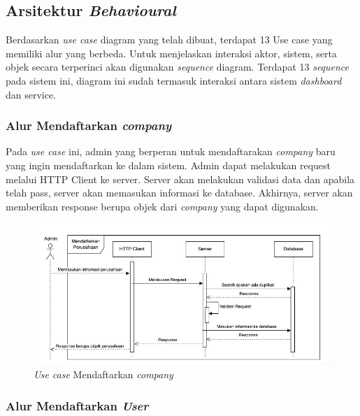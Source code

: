 \subsection{Arsitektur \textit{Behavioural}}
\label{subsec:arsitektur-behavioural}

Berdasarkan \textit{use case} diagram yang telah dibuat, terdapat 13 Use case yang memiliki alur yang berbeda. Untuk menjelaskan interaksi aktor, sistem, serta objek secara terperinci akan digunakan \textit{sequence} diagram. Terdapat 13 \textit{sequence} pada sistem ini, diagram ini sudah termasuk interaksi antara sistem \textit{dashboard} dan service.

\subsubsection{Alur Mendaftarkan \textit{company}}

Pada \textit{use case} ini, admin yang berperan untuk mendaftarakan \textit{company} baru yang ingin mendaftarkan ke dalam sistem. Admin dapat melakukan request melalui HTTP Client ke server. Server akan melakukan validasi data dan apabila telah pass, server akan memasukan informasi ke database. Akhirnya, server akan memberikan response berupa objek dari \textit{company} yang dapat digunakan.

\begin{figure}
  \centering
  \includegraphics[width=1\textwidth]{resources/chapter-3/usecase/uc-01.jpg}
  \caption{\textit{Use case} Mendaftarkan \textit{company}}
  \label{fig:usecase-01}
\end{figure}

\pagebreak

\subsubsection{Alur Mendaftarkan \textit{User}}

